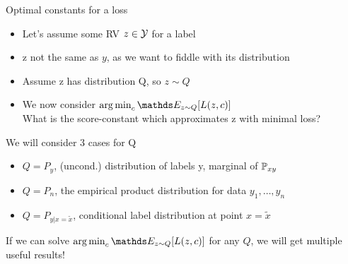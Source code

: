 \documentclass[11pt,compress,t,notes=noshow, xcolor=table]{beamer}
\begin{document}
\begin{vbframe}{Optimal constants for a loss}

\begin{itemize}
\item Let's assume some RV $z \in \mathcal{Y}$ for a label
\item z not the same as $y$, as we want to fiddle with its distribution
\item Assume z has distribution Q, so $z \sim Q$
\item We now consider $\argmin_c \E_{z \sim Q}[L(z, c)]$\\
What is the score-constant which approximates z with minimal loss?
\end{itemize}

\lz

We will consider 3 cases for Q
\begin{itemize}
\item $Q = P_y$, (uncond.) distribution of labels y, marginal of $\mathbb{P}_{xy}$
\item $Q = P_n$, the empirical product distribution for data $y_1, \ldots, y_n$
\item $Q = P_{y | x = \tilde{x}}$, conditional label distribution at point $x = \tilde{x}$
\end{itemize}

\lz

If we can solve $\argmin_c \E_{z \sim Q}[L(z, c)]$ for any $Q$,
we will get multiple useful results!


\end{vbframe}
\end{document}
